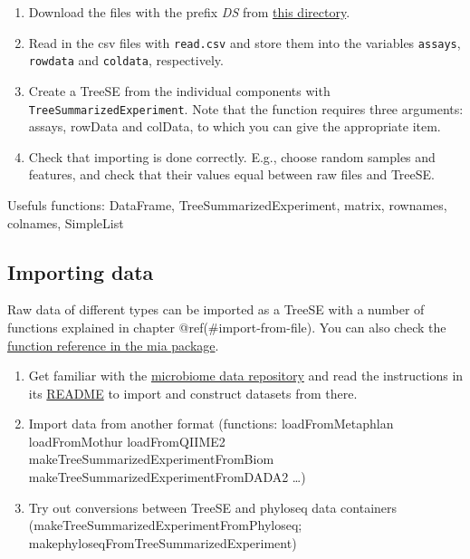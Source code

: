 \documentclass[
]{book}
\providecommand{\tightlist}{%
  \setlength{\itemsep}{0pt}\setlength{\parskip}{0pt}}
\begin{document}
\begin{enumerate}
\def\labelenumi{\arabic{enumi}.}
\tightlist
\item
  Download the files with the prefix \emph{DS} from
  \href{https://github.com/JuliaTurkuDataScience/MicrobiomeAnalysis.jl/tree/main/src/assets}{this directory}.
\item
  Read in the csv files with \texttt{read.csv} and store them into the variables
  \texttt{assays}, \texttt{rowdata} and \texttt{coldata}, respectively.
\item
  Create a TreeSE from the individual components with \texttt{TreeSummarizedExperiment}.
  Note that the function requires three arguments: assays, rowData and colData,
  to which you can give the appropriate item.
\item
  Check that importing is done correctly. E.g., choose random samples and features,
  and check that their values equal between raw files and TreeSE.
\end{enumerate}

Usefuls functions: DataFrame, TreeSummarizedExperiment, matrix, rownames, colnames, SimpleList

\hypertarget{importing-data}{%
\subsection{Importing data}\label{importing-data}}

Raw data of different types can be imported as a TreeSE with a number of
functions explained in chapter @ref(\#import-from-file). You can also check the
\href{https://microbiome.github.io/mia/reference/index.html}{function reference in the mia package}.

\begin{enumerate}
\def\labelenumi{\arabic{enumi}.}
\tightlist
\item
  Get familiar with the
  \href{https://github.com/microbiome/data}{microbiome data repository}
  and read the instructions in its
  \href{https://github.com/microbiome/data\#training-microbiome-datasets}{README}
  to import and construct datasets from there.
\item
  Import data from another format (functions: loadFromMetaphlan \textbar{} loadFromMothur \textbar{} loadFromQIIME2 \textbar{} makeTreeSummarizedExperimentFromBiom \textbar{} makeTreeSummarizedExperimentFromDADA2 \ldots)
\item
  Try out conversions between TreeSE and phyloseq data containers (makeTreeSummarizedExperimentFromPhyloseq; makephyloseqFromTreeSummarizedExperiment)
\end{enumerate}
\end{document}

